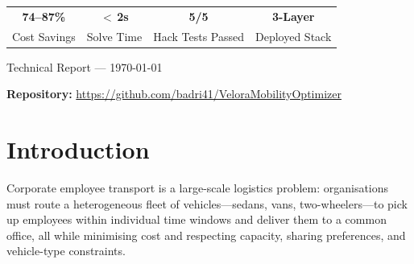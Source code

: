 \documentclass[11pt,a4paper]{article}
\begin{document}
\begin{titlepage}
\vspace{0.6cm}

\begin{tcolorbox}[
    enhanced,
    colback=velgray,
    colframe=gray!40,
    boxrule=0.4pt,
    arc=3pt,
    width=0.85\textwidth,
    halign=center,
    top=6pt, bottom=6pt
]
\centering
\begin{tabular}{cccc}
\textbf{\color{velblue}74--87\%} & \textbf{\color{velblue}$<$\,2s} & \textbf{\color{velblue}5/5} & \textbf{\color{velblue}3-Layer} \\
Cost Savings & Solve Time & Hack Tests Passed & Deployed Stack \\
\end{tabular}
\end{tcolorbox}

\vfill

{\small\color{gray} Technical Report --- \today}

\end{titlepage}

\thispagestyle{empty}

\vspace*{-0.5cm}

\begin{tcolorbox}[
    enhanced,
    colback=vellight,
    colframe=velblue,
    boxrule=0.6pt,
    arc=3pt,
    width=\textwidth,
    halign=center,
    top=6pt, bottom=6pt
]
\centering
\textbf{\color{velblue}Repository:}\quad
\url{https://github.com/badri41/VeloraMobilityOptimizer}
\end{tcolorbox}

\vspace{0.2cm}

\tableofcontents

\newpage

\section{Introduction}

Corporate employee transport is a large-scale logistics problem: organisations must route a heterogeneous fleet of vehicles---sedans, vans, two-wheelers---to pick up employees within individual time windows and deliver them to a common office, all while minimising cost and respecting capacity, sharing preferences, and vehicle-type constraints.
\end{document}

